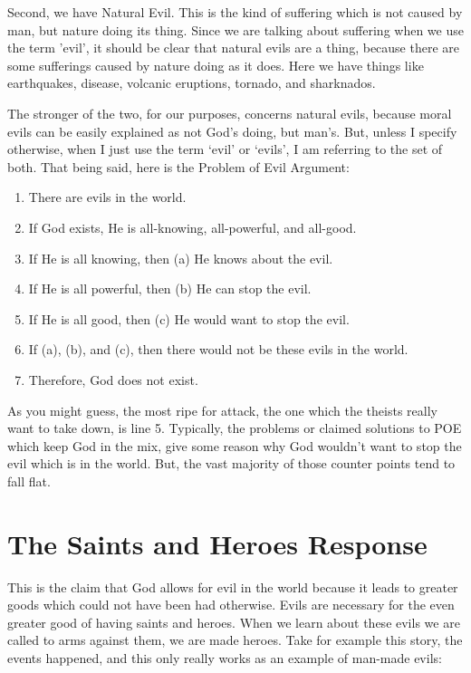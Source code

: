 Second, we have Natural Evil. This is the kind of suffering which is not caused by man, but nature doing its thing. Since we are talking about suffering when we use the term 'evil', it should be clear that natural evils are a thing, because there are some sufferings caused by nature doing as it does. Here we have things like earthquakes, disease, volcanic eruptions, tornado, and sharknados. 

The stronger of the two, for our purposes, concerns natural evils, because moral evils can be easily explained as not God's doing, but man's. But, unless I specify otherwise, when I just use the term ‘evil’ or ‘evils’, I am referring to the set of both. That being said, here is the Problem of Evil Argument:
\begin{enumerate}
    \item There are evils in the world.
    \item If God exists, He is all-knowing, all-powerful, and all-good.
    \item If He is all knowing, then (a) He knows about the evil.
    \item If He is all powerful, then (b) He can stop the evil.
    \item If He is all good, then (c) He would want to stop the evil.
    \item If (a), (b), and (c), then there would not be these evils in the world.
    \item Therefore, God does not exist.
\end{enumerate}
As you might guess, the most ripe for attack, the one which the theists really want to take down, is line 5. Typically, the problems or claimed solutions to POE which keep God in the mix, give some reason why God wouldn't want to stop the evil which is in the world. But, the vast majority of those counter points tend to fall flat. 

\section{The Saints and Heroes Response}
This is the claim that God allows for evil in the world because it leads to greater goods which could not have been had otherwise. Evils are necessary for the even greater good of having saints and heroes. When we learn about these evils we are called to arms against them, we are made heroes. Take for example this story, the events happened, and this only really works as an example of man-made evils:

